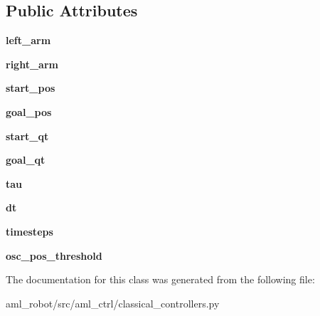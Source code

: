 \subsection*{Public Attributes}
\begin{DoxyCompactItemize}
\item 
\hypertarget{classaml__ctrl_1_1classical__controllers_1_1_min_jerk_controller_aabe9d1a061a6f6cb9b26979e2a93c7c6}{}\label{classaml__ctrl_1_1classical__controllers_1_1_min_jerk_controller_aabe9d1a061a6f6cb9b26979e2a93c7c6} 
{\bfseries left\+\_\+arm}
\item 
\hypertarget{classaml__ctrl_1_1classical__controllers_1_1_min_jerk_controller_a2f49b270f60da2410036f62b293643a1}{}\label{classaml__ctrl_1_1classical__controllers_1_1_min_jerk_controller_a2f49b270f60da2410036f62b293643a1} 
{\bfseries right\+\_\+arm}
\item 
\hypertarget{classaml__ctrl_1_1classical__controllers_1_1_min_jerk_controller_a51a6ea302e41b4ced13f44a8ed1873f9}{}\label{classaml__ctrl_1_1classical__controllers_1_1_min_jerk_controller_a51a6ea302e41b4ced13f44a8ed1873f9} 
{\bfseries start\+\_\+pos}
\item 
\hypertarget{classaml__ctrl_1_1classical__controllers_1_1_min_jerk_controller_a457eed8bb3e71b2ce6da0a3f470f37b4}{}\label{classaml__ctrl_1_1classical__controllers_1_1_min_jerk_controller_a457eed8bb3e71b2ce6da0a3f470f37b4} 
{\bfseries goal\+\_\+pos}
\item 
\hypertarget{classaml__ctrl_1_1classical__controllers_1_1_min_jerk_controller_a7c27621e163f2c438c1b76cfb9477e82}{}\label{classaml__ctrl_1_1classical__controllers_1_1_min_jerk_controller_a7c27621e163f2c438c1b76cfb9477e82} 
{\bfseries start\+\_\+qt}
\item 
\hypertarget{classaml__ctrl_1_1classical__controllers_1_1_min_jerk_controller_a1b557c17e8356729fb179ab67ec0d1d1}{}\label{classaml__ctrl_1_1classical__controllers_1_1_min_jerk_controller_a1b557c17e8356729fb179ab67ec0d1d1} 
{\bfseries goal\+\_\+qt}
\item 
\hypertarget{classaml__ctrl_1_1classical__controllers_1_1_min_jerk_controller_a23a689c23418cac10b3ad373eec3dcd0}{}\label{classaml__ctrl_1_1classical__controllers_1_1_min_jerk_controller_a23a689c23418cac10b3ad373eec3dcd0} 
{\bfseries tau}
\item 
\hypertarget{classaml__ctrl_1_1classical__controllers_1_1_min_jerk_controller_aceb3147e0da967bfc101ea5a1e6489a5}{}\label{classaml__ctrl_1_1classical__controllers_1_1_min_jerk_controller_aceb3147e0da967bfc101ea5a1e6489a5} 
{\bfseries dt}
\item 
\hypertarget{classaml__ctrl_1_1classical__controllers_1_1_min_jerk_controller_aedd1be03de0d0d6707a5b94716123b3b}{}\label{classaml__ctrl_1_1classical__controllers_1_1_min_jerk_controller_aedd1be03de0d0d6707a5b94716123b3b} 
{\bfseries timesteps}
\item 
\hypertarget{classaml__ctrl_1_1classical__controllers_1_1_min_jerk_controller_a409c6319b72e2f79bb962f9d1a69cf12}{}\label{classaml__ctrl_1_1classical__controllers_1_1_min_jerk_controller_a409c6319b72e2f79bb962f9d1a69cf12} 
{\bfseries osc\+\_\+pos\+\_\+threshold}
\end{DoxyCompactItemize}


The documentation for this class was generated from the following file\+:\begin{DoxyCompactItemize}
\item 
aml\+\_\+robot/src/aml\+\_\+ctrl/classical\+\_\+controllers.\+py\end{DoxyCompactItemize}
